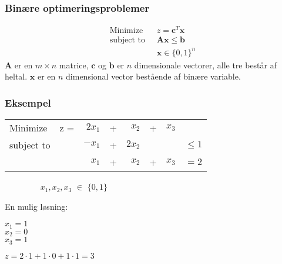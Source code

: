 \documentclass[12pt]{beamer}
\begin{document}
\begin{frame}
\frametitle{Binære optimeringsproblemer}
\begin{align}
 \text{Minimize }\; &z =  \mathbf{c}^T\mathbf{x} \\ 
 \text{subject to } \; & \mathbf{A}\mathbf{x} \leq \mathbf{b} \\ 
 & \mathbf{x} \in \{0,1\}^n
\end{align} \noindent
$\mathbf{A}$ er en $m \times n$ matrice, $\mathbf{c}$ og $\mathbf{b}$ er $n$ dimensionale vectorer, alle tre består af 
heltal. $\mathbf{x}$ er en $n$ dimensional vector bestående af binære variable.   
\end{frame}


\begin{frame}
\frametitle{Eksempel}
\begin{table}[]
\begin{center}
\label{my-label}
\begin{tabular}{llrcrlrl}
Minimize   & z = & $2x_1$        & +  & $x_2$       & + & $x_3$ &          \\
subject to &     & $-x_1$        & + & $2x_2$      &   &       & $\leq 1$  \\
           &     & $x_1$         & + & $x_2$       & + & $x_3$ & $=2$     
               
\end{tabular}
\end{center}
$\qquad \qquad $  $x_1,x_2,x_3 $  $\in$ $\{0,1\}$ 
\end{table}
En mulig løsning: \\
\vspace{0.2cm}
\begin{minipage}{0.47\linewidth}
 $x_1 = 1$  \\
 $x_2 = 0$ \\ 
 $x_3 = 1$ \\
\end{minipage}
\begin{minipage}{0.47\linewidth}

 $z = 2\cdot 1 + 1\cdot 0 + 1\cdot 1  =3$ \\
\end{minipage}
\end{frame}
\end{document}
